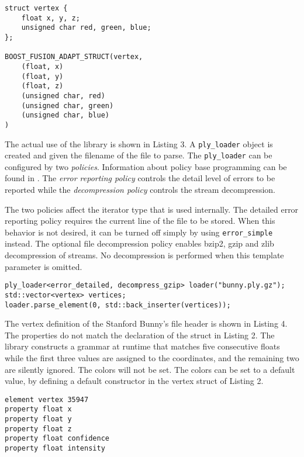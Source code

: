 \documentclass[a4paper,parskip=half,twocolumn]{scrartcl}
\begin{document}
\begin{lstlisting}[frame=tb,caption=Adapting a vertex struct]
struct vertex {
	float x, y, z;
	unsigned char red, green, blue;
};

BOOST_FUSION_ADAPT_STRUCT(vertex,
	(float, x)
	(float, y)
	(float, z)
	(unsigned char, red)
	(unsigned char, green)
	(unsigned char, blue)
)
\end{lstlisting}

The actual use of the library is shown in Listing 3. A \texttt{ply\_loader}
object is created and given the filename of the file to parse. The
\texttt{ply\_loader} can be configured by two \emph{policies}. Information about
policy base programming can be found in \cite{Alexandrescu:2001:MCD:377789}. The
\emph{error reporting policy} controls the detail level of errors to be reported
while the \emph{decompression policy} controls the stream decompression.

The two policies affect the iterator type that is used internally. The detailed
error reporting policy requires the current line of the file to be stored. When
this behavior is not desired, it can be turned off simply by using
\texttt{error\_simple} instead. The optional file decompression policy enables
bzip2, gzip and zlib decompression of streams. No decompression is performed
when this template parameter is omitted.

\begin{lstlisting}[frame=tb,caption=Example use of the library]
ply_loader<error_detailed, decompress_gzip> loader("bunny.ply.gz");
std::vector<vertex> vertices;
loader.parse_element(0, std::back_inserter(vertices));
\end{lstlisting}

The vertex definition of the Stanford Bunny's file header is shown in Listing
4. The properties do not match the declaration of the struct in Listing 2. The
library constructs a grammar at runtime that matches five consecutive floats
while the first three values are assigned to the coordinates, and the remaining
two are silently ignored. The colors will not be set. The colors can be set to a
default value, by defining a default constructor in the vertex struct of Listing
2.

\begin{lstlisting}[frame=tb,
  caption=Stanford Bunny's definition of the vertex element]
element vertex 35947
property float x
property float y
property float z
property float confidence
property float intensity
\end{lstlisting}
\end{document}
